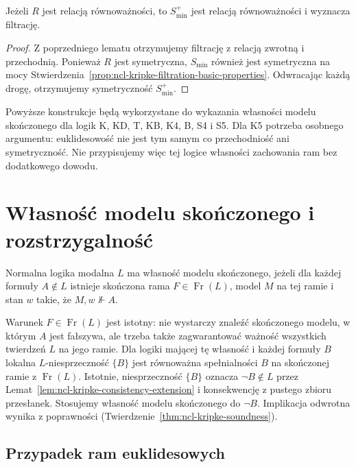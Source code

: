 \begin{wniosek}
\label{cor:ncl-kripke-equivalence-filtration}
Jeżeli $R$ jest relacją równoważności,
to $S_{\min}^{+}$ jest relacją równoważności
i wyznacza filtrację.
\end{wniosek}
\begin{proof}
Z poprzedniego lematu otrzymujemy filtrację
z relacją zwrotną i przechodnią.
Ponieważ $R$ jest symetryczna, $S_{\min}$
również jest symetryczna na mocy
Stwierdzenia~\ref{prop:ncl-kripke-filtration-basic-properties}.
Odwracając każdą drogę, otrzymujemy
symetryczność $S_{\min}^{+}$.
\end{proof}

Powyższe konstrukcje będą wykorzystane
do wykazania własności modelu skończonego
dla logik K, KD, T, KB, K4, B, S4 i S5.
Dla K5 potrzeba osobnego argumentu:
euklidesowość nie jest tym samym co
przechodniość ani symetryczność.
Nie przypisujemy więc tej logice własności
zachowania ram bez dodatkowego dowodu.

\section{Własność modelu skończonego i rozstrzygalność}

\begin{definicja}
\label{def:ncl-kripke-finite-model-property}
Normalna logika modalna $L$ ma własność modelu
skończonego, jeżeli dla każdej formuły $A\notin L$
istnieje skończona rama $F\in\operatorname{Fr}(L)$,
model $M$ na tej ramie i stan $w$ takie,
że $M,w\not\Vdash A$.
\end{definicja}

Warunek $F\in\operatorname{Fr}(L)$ jest istotny:
nie wystarczy znaleźć skończonego modelu,
w którym $A$ jest fałszywa, ale trzeba także
zagwarantować ważność wszystkich twierdzeń $L$
na jego ramie. Dla logiki mającej tę własność
i każdej formuły $B$ lokalna $L$-niesprzeczność
$\{B\}$ jest równoważna spełnialności $B$
na skończonej ramie z $\operatorname{Fr}(L)$.
Istotnie, niesprzeczność $\{B\}$ oznacza
$\neg B\notin L$ przez
Lemat~\ref{lem:ncl-kripke-consistency-extension}
i konsekwencję z pustego zbioru przesłanek.
Stosujemy własność modelu skończonego
do $\neg B$. Implikacja odwrotna wynika
z poprawności
(Twierdzenie~\ref{thm:ncl-kripke-soundness}).

\subsection{Przypadek ram euklidesowych}

